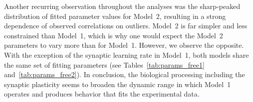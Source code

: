 \documentclass[a4paper]{scrreprt}
\begin{document}
Another recurring observation throughout the analyses was the sharp-peaked distribution of fitted parameter values for Model~2, resulting in a strong dependence of observed correlations on outliers. 
Model~2 is far simpler and less constrained than Model~1, which is why one would expect the Model~2 parameters to vary more than for Model~1. However, we observe the opposite.
With the exception of the synaptic learning rate in Model~1, both models share the same set of fitting parameters (see Tables~\ref{tab:params_free1} and~\ref{tab:params_free2}). 
In conclusion, the biological processing including the synaptic plasticity seems to broaden the dynamic range in which Model~1 operates and produces behavior that fits the experimental data.
\end{document}
